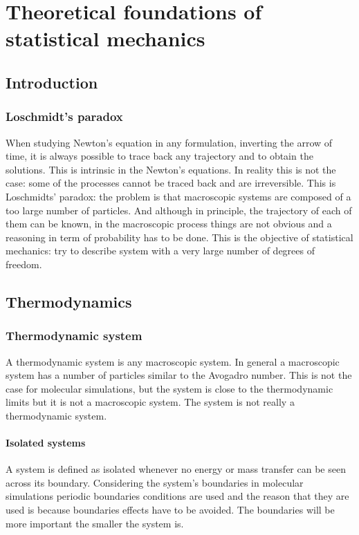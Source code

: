 \chapter{Theoretical foundations of statistical mechanics}

\section{Introduction}

	\subsection{Loschmidt's paradox}
	When studying Newton's equation in any formulation, inverting the arrow of time, it is always possible to trace back any trajectory and to obtain the solutions.
	This is intrinsic in the Newton's equations.
	In reality this is not the case: some of the processes cannot be traced back and are irreversible.
	This is	Loschmidts' paradox: the problem is that macroscopic systems are composed of a too large number of particles.
	And although in principle, the trajectory of each of them can be known, in the macroscopic process things are not obvious and a reasoning in term of probability has to be done.
	This is the objective of statistical mechanics: try to describe system with a very large number of degrees of freedom.

\section{Thermodynamics}

	\subsection{Thermodynamic system}
	A thermodynamic system is any macroscopic system.
	In general a macroscopic system has a number of particles similar to the Avogadro number.
	This is not the case for molecular simulations, but the system is close to the thermodynamic limits but it is not a macroscopic system.
	The system is not really a thermodynamic system.

		\subsubsection{Isolated systems}
		A system is defined as isolated whenever no energy or mass transfer can be seen across its boundary.
		Considering the system's boundaries in molecular simulations periodic boundaries conditions are used and the reason that they are used is because boundaries effects have to be avoided.
		The boundaries will be more important the smaller the system is.

